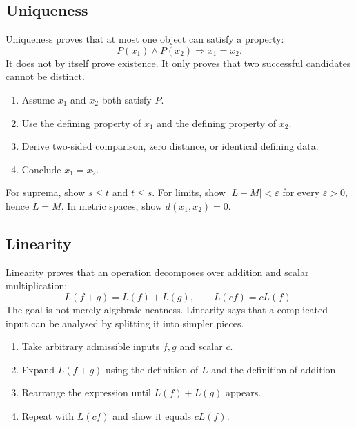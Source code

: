 \subsection*{Uniqueness}
\label{subsec:property-uniqueness}

Uniqueness proves that at most one object can satisfy a property:
\[
  P(x_1)\land P(x_2)\Longrightarrow x_1=x_2.
\]
It does not by itself prove existence. It only proves that two successful
candidates cannot be distinct.

\begin{remark}
\begin{enumerate}
  \item Assume $x_1$ and $x_2$ both satisfy $P$.
  \item Use the defining property of $x_1$ and the defining property of $x_2$.
  \item Derive two-sided comparison, zero distance, or identical defining
        data.
  \item Conclude $x_1=x_2$.
\end{enumerate}
\end{remark}

\begin{remark}
For suprema, show $s\leq t$ and $t\leq s$. For limits, show
$|L-M|<\varepsilon$ for every $\varepsilon>0$, hence $L=M$. In metric spaces,
show $d(x_1,x_2)=0$.
\end{remark}

\subsection*{Linearity}
\label{subsec:property-linearity}

Linearity proves that an operation decomposes over addition and scalar
multiplication:
\[
  L(f+g)=L(f)+L(g),
  \qquad
  L(cf)=cL(f).
\]
The goal is not merely algebraic neatness. Linearity says that a complicated
input can be analysed by splitting it into simpler pieces.

\begin{remark}
\begin{enumerate}
  \item Take arbitrary admissible inputs $f,g$ and scalar $c$.
  \item Expand $L(f+g)$ using the definition of $L$ and the definition of
        addition.
  \item Rearrange the expression until $L(f)+L(g)$ appears.
  \item Repeat with $L(cf)$ and show it equals $cL(f)$.
\end{enumerate}
\end{remark}

